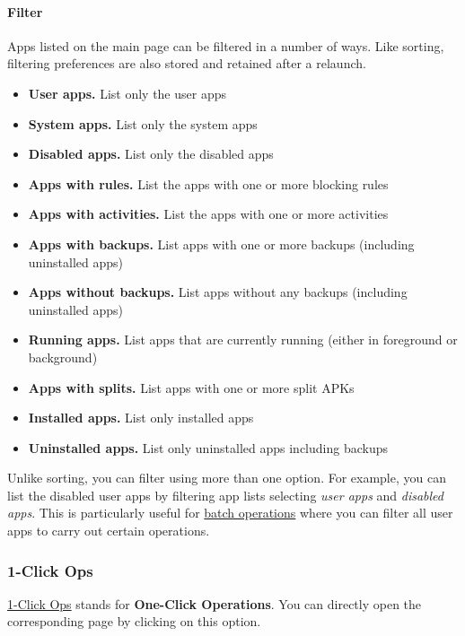 \paragraph{Filter}\hypertarget{par:main-page-filter}{}
Apps listed on the main page can be filtered in a number of ways. Like sorting, filtering preferences are also stored
and retained after a relaunch.
\begin{itemize}
    \item \textbf{User apps.} List only the user apps
    \item \textbf{System apps.} List only the system apps
    \item \textbf{Disabled apps.} List only the disabled apps
    \item \textbf{Apps with rules.} List the apps with one or more blocking rules
    \item \textbf{Apps with activities.} List the apps with one or more activities
    \item \textbf{Apps with backups.} List apps with one or more backups (including uninstalled apps)
    \item \textbf{Apps without backups.} List apps without any backups (including uninstalled apps)
    \item \textbf{Running apps.} List apps that are currently running (either in foreground or background)
    \item \textbf{Apps with splits.} List apps with one or more split APKs
    \item \textbf{Installed apps.} List only installed apps
    \item \textbf{Uninstalled apps.} List only uninstalled apps including backups
\end{itemize}

Unlike sorting, you can filter using more than one option. For example, you can list the disabled user apps by filtering
app lists selecting \textit{user apps} and \textit{disabled apps}. This is particularly useful for
\hyperref[subsec:batch-operations]{batch operations} where you can filter all user apps to carry out certain operations.

\subsubsection{1-Click Ops}\label{subsubsec:main:1-click-ops}
\hyperref[sec:1-click-ops-page]{1-Click Ops} stands for \textbf{One-Click Operations}. You can directly open the
corresponding page by clicking on this option.


